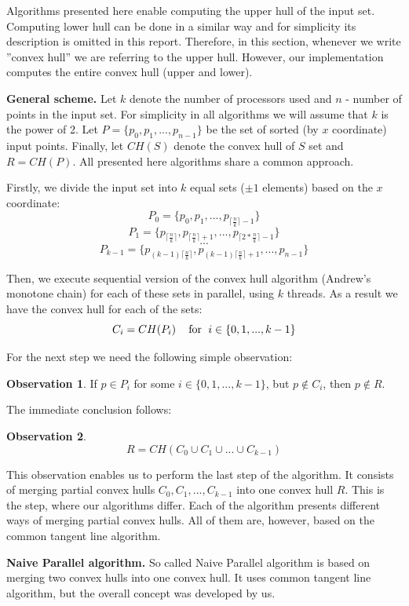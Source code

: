 \documentclass[letterpaper]{article}
\newcommand{\mypar}[1]{{\bf #1.}}
\theoremstyle{definition}
\newtheorem{observation}{Observation}
\begin{document}
Algorithms presented here enable computing the upper hull of the input set. 
Computing lower hull can be done in a similar way and for simplicity its description is omitted in this report. 
Therefore, in this section, whenever we write ''convex hull'' we are referring to the upper hull.
However, our implementation computes the entire convex hull (upper and lower).  

\mypar{General scheme}
Let $k$ denote the number of processors used and $n$ - number of points in the input set.
For simplicity in all algorithms we will assume that $k$ is the power of 2. 
Let $P = \{p_0, p_1, ..., p_{n-1} \}$ be the set of sorted (by $x$ coordinate) input points.
Finally, let $CH(S)$ denote the convex hull of $S$ set and $R=CH(P)$.
All presented here algorithms share a common approach.

Firstly, we divide the input set into $k$ equal sets ($\pm 1$ elements) based on the $x$ coordinate:
$$P_0 = \{p_0, p_1, ..., p_{\lceil{\frac{n}{k}}\rceil - 1}\}$$
$$P_1 = \{p_{\lceil{\frac{n}{k}}\rceil}, p_{\lceil{\frac{n}{k}}\rceil + 1}, ..., p_{\lceil{2 * \frac{n}{k}}\rceil - 1}\}$$
$$...$$
$$P_{k-1} = \{p_{(k-1)\lceil{\frac{n}{k}}\rceil}, p_{(k-1)\lceil{\frac{n}{k}}\rceil + 1}, ..., p_{n- 1} \}$$


Then, we execute sequential version of the convex hull algorithm (Andrew's monotone chain) for each of these sets in parallel, using $k$ threads.
As a result we have the convex hull for each of the sets:
$$C_i = CH(P_i) \textrm{\;\;\; for \;} i \in \{0, 1, ..., k - 1\}$$

For the next step we need the following simple observation:
\begin{observation}
If $p \in P_i$ for some $i \in \{0, 1, ..., k - 1\}$, but $p \notin C_i$, then $p \notin R$.
\end{observation}

The immediate conclusion follows:
\begin{observation}
$$R = CH(C_0 \cup C_1 \cup ... \cup C_{k - 1})$$
\end{observation}

This observation enables us to perform the last step of the algorithm.
It consists of merging partial convex hulls $C_0, C_1, ..., C_{k - 1}$ into one convex hull $R$.
This is the step, where our algorithms differ.
Each of the algorithm presents different ways of merging partial convex hulls.
All of them are, however, based on the common tangent line algorithm.

\mypar{Naive Parallel algorithm}
So called Naive Parallel algorithm is based on merging two convex hulls into one convex hull.
It uses common tangent line algorithm, but the overall concept was developed by us.
\end{document}
